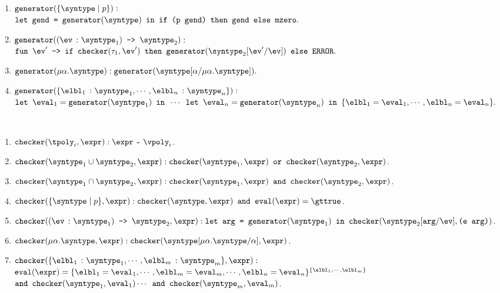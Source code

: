 \begin{definition}
\begin{enumerate}
    \item $\mkgen{\mktset{\syntype}{p}} : $ \\ 
    $\texttt{let gend = }\mkgen{\syntype} \texttt{ in } \ife{\texttt{(p gend)}}{\texttt{gend}}{\mzero}.$
    \item $\mkgen{\mkdfun{\ev}{\syntype_1}{\syntype_2}} : $
    \\$\mkfunv{\ev'}{\ife{\mkche{\tau_1}{\ev'}}{\mkgen{\substitute{\syntype_2}{\ev'}{\ev}}}{\eerror}}.$
    \item $\mkgen{\mkmiu{\alpha}{\syntype}} : \mkgen{\substitute{\syntype}{\alpha}{\mkmiu{\alpha}{\syntype}}}.$
    \item $\mkgen{\{\hastype{\elbl_1}{\syntype_1}, \cdots, \hastype{\elbl_n}{\syntype_n}\}} :$ \\ $\texttt{let }\eval_1 = \mkgen{\syntype_1}\texttt{ in }\cdots\texttt{ let }\eval_n = \mkgen{\syntype_n}\texttt{ in } \{\elbl_1 = \eval_1, \cdots, \elbl_n = \eval_n\}.$
  \end{enumerate}
\end{definition}

\begin{definition}
  \label{def_cheExt}
  \ \par 
  \begin{enumerate}
    \item $\mkche{\tpoly_i}{\expr} : \matches{\expr}{\vpoly_i}$.
    \item $\mkche{\mkunion{\syntype_1}{\syntype_2}}{\expr} : \mkche{\syntype_1}{\expr} \texttt{ or } \mkche{\syntype_2}{\expr}$.
    \item $\mkche{\mkintersect{\syntype_1}{\syntype_2}}{\expr} : \mkche{\syntype_1}{\expr} \texttt{ and } \mkche{\syntype_2}{\expr}$. 
    \item $\mkche{\mktset{\syntype}{p}}{\expr} : \mkche{\syntype}{\expr} \texttt{ and } \evaluate{\expr} = \gttrue$.
    \item $\mkche{\mkdfun{\ev}{\syntype_1}{\syntype_2}}{\expr} : \texttt{let arg = } \mkgen{\syntype_1} \texttt{ in } \mkche{\substitute{\syntype_2}{\texttt{arg}}{\ev}}{\texttt{(e arg)}}$.
    \item $\mkche{\mkmiu{\alpha}{\syntype}}{\expr} : \mkche{\substitute{\syntype}{\mkmiu{\alpha}{\syntype}}{\alpha}}{\expr}$.
    \item $\mkche{\{\hastype{\elbl_1}{\syntype_1}, \cdots, \hastype{\elbl_m}{\syntype_m}\}}{\expr} :$
    $\evaluate{\expr} = \{\elbl_1 = \eval_1, \cdots, \elbl_m = \eval_m, \cdots, \elbl_n = \eval_n\}^{\{\elbl_1, \cdots, \elbl_m\}}$ \\ 
    $\texttt{and } \mkche{\syntype_1}{\eval_1} \cdots \texttt{ and } \mkche{\syntype_m}{\eval_m}$.
  \end{enumerate}
\end{definition}

